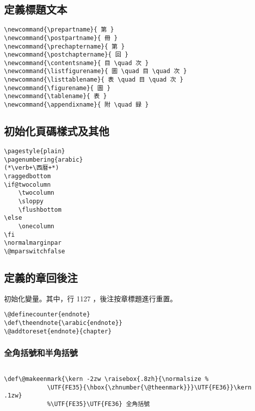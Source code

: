 \subsection{定義標題文本}

\begin{lstlisting}[firstnumber=1100]
\newcommand{\prepartname}{ 第 }
\newcommand{\postpartname}{ 冊 }
\newcommand{\prechaptername}{ 第 }
\newcommand{\postchaptername}{ 回 }
\newcommand{\contentsname}{ 目 \quad 次 }
\newcommand{\listfigurename}{ 圖 \quad 目 \quad 次 }
\newcommand{\listtablename}{ 表 \quad 目 \quad 次 }
\newcommand{\figurename}{ 圖 }
\newcommand{\tablename}{ 表 }
\newcommand{\appendixname}{ 附 \quad 録 }
\end{lstlisting}

\subsection{初始化頁碼樣式及其他}

\begin{lstlisting}[firstnumber=1110]
\pagestyle{plain}
\pagenumbering{arabic}
(*\verb+\西暦+*)
\raggedbottom
\if@twocolumn
	\twocolumn
	\sloppy
	\flushbottom
\else
	\onecolumn
\fi
\normalmarginpar
\@mparswitchfalse
\end{lstlisting}


\subsection{定義的章回後注}

\par 初始化變量。其中，行 1127 ，後注按章標題進行重置。
\begin{lstlisting}[firstnumber=1125]
\@definecounter{endnote}
\def\theendnote{\arabic{endnote}}
\@addtoreset{endnote}{chapter}
\end{lstlisting}



\subsubsection{全角括號和半角括號}

\begin{lstlisting}[firstnumber=1129]
%\def\@makeenmark{\kern -1.2zw \raisebox{.8zh}{\tiny （{\hbox{\yoko\expandafter\ajTsumesuji\expandafter*\expandafter{\number\@theenmark}}}）}}

\def\@makeenmark{\kern -2zw \raisebox{.8zh}{\normalsize %
			\UTF{FE35}{\hbox{\zhnumber{\@theenmark}}}\UTF{FE36}}\kern .1zw}
			%\UTF{FE35}\UTF{FE36} 全角括號
\end{lstlisting}



